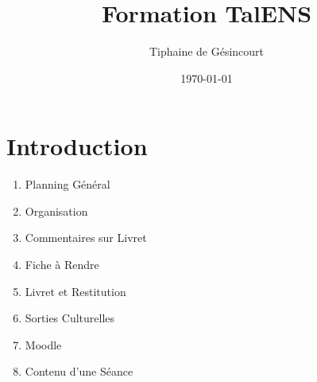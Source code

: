 \documentclass{cours}
\title{Formation TalENS}
\date{\today}
\author{Tiphaine de Gésincourt}
\begin{document}
\section*{Introduction}
\begin{enumerate}
    \item Planning Général
    \item Organisation
    \item Commentaires sur Livret
    \item Fiche à Rendre
    \item Livret et Restitution
    \item Sorties Culturelles 
    \item Moodle
    \item Contenu d'une Séance
\end{enumerate}
\end{document}
